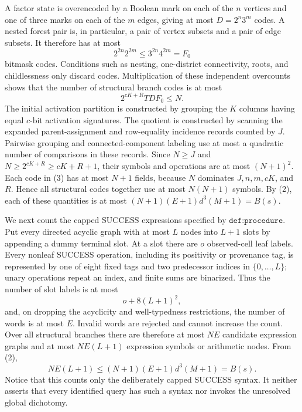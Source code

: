A factor state is overencoded by a Boolean mark on each of the \(n\) vertices and one of three marks on each of the \(m\) edges, giving at most \(D=2^n3^m\) codes.  A nested forest pair is, in particular, a pair of vertex subsets and a pair of edge subsets.  It therefore has at most
\[
 2^{2n}2^{2m}\leq 3^{2n}4^{2m}=F_0
\]
bitmask codes.  Conditions such as nesting, one-district connectivity, roots, and childlessness only discard codes.  Multiplication of these independent overcounts shows that the number of structural branch codes is at most
\[
 2^{cK+R}TDF_0\leq N. \tag{3}
\]
The initial activation partition is constructed by grouping the \(K\) columns having equal \(c\)-bit activation signatures.  The quotient is constructed by scanning the expanded parent-assignment and row-equality incidence records counted by \(J\).  Pairwise grouping and connected-component labeling use at most a quadratic number of comparisons in these records.  Since \(N\geq J\) and \(N\geq 2^{cK+R}\geq cK+R+1\), their symbols and operations are at most \((N+1)^2\).  Each code in (3) has at most \(N+1\) fields, because \(N\) dominates \(J,n,m,cK\), and \(R\).  Hence all structural codes together use at most \(N(N+1)\) symbols.  By (2), each of these quantities is at most \((N+1)(E+1)d^3(M+1)=B(s)\).

We next count the capped SUCCESS expressions specified by \(\texttt{def:procedure}\).  Put every directed acyclic graph with at most \(L\) nodes into \(L+1\) slots by appending a dummy terminal slot.  At a slot there are \(o\) observed-cell leaf labels.  Every nonleaf SUCCESS operation, including its positivity or provenance tag, is represented by one of eight fixed tags and two predecessor indices in \(\{0,\ldots,L\}\); unary operations repeat an index, and finite sums are binarized.  Thus the number of slot labels is at most
\[
 o+8(L+1)^2,
\]
and, on dropping the acyclicity and well-typedness restrictions, the number of words is at most \(E\).  Invalid words are rejected and cannot increase the count.  Over all structural branches there are therefore at most \(NE\) candidate expression graphs and at most \(NE(L+1)\) expression symbols or arithmetic nodes.  From (2),
\[
 NE(L+1)
 \leq (N+1)(E+1)d^3(M+1)
 =B(s). \tag{4}
\]
Notice that this counts only the deliberately capped SUCCESS syntax.  It neither asserts that every identified query has such a syntax nor invokes the unresolved global dichotomy.


